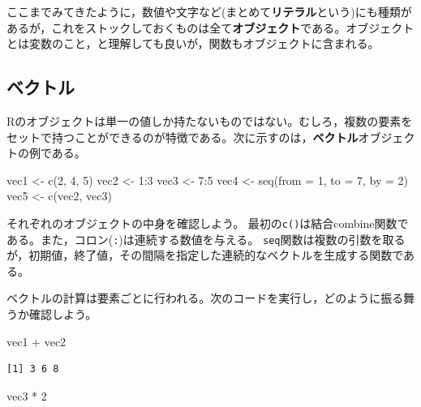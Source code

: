 \documentclass[
  a4paper,
]{ltjsbook}
\newenvironment{Shaded}{\begin{snugshade}}{\end{snugshade}}
\newcommand{\AttributeTok}[1]{\textcolor[rgb]{0.40,0.45,0.13}{#1}}
\newcommand{\DecValTok}[1]{\textcolor[rgb]{0.68,0.00,0.00}{#1}}
\newcommand{\FunctionTok}[1]{\textcolor[rgb]{0.28,0.35,0.67}{#1}}
\newcommand{\NormalTok}[1]{\textcolor[rgb]{0.00,0.23,0.31}{#1}}
\newcommand{\OtherTok}[1]{\textcolor[rgb]{0.00,0.23,0.31}{#1}}
\newcommand{\SpecialCharTok}[1]{\textcolor[rgb]{0.37,0.37,0.37}{#1}}
\begin{document}
ここまでみてきたように，数値や文字など(まとめて\textbf{リテラル}という)にも種類があるが，これをストックしておくものは全て\textbf{オブジェクト}である。オブジェクトとは変数のこと，と理解しても良いが，関数もオブジェクトに含まれる。

\subsection{ベクトル}\label{sec-vector}

Rのオブジェクトは単一の値しか持たないものではない。むしろ，複数の要素をセットで持つことができるのが特徴である。次に示すのは，\textbf{ベクトル}オブジェクトの例である。

\begin{Shaded}
\begin{Highlighting}[]
\NormalTok{vec1 }\OtherTok{\textless{}{-}} \FunctionTok{c}\NormalTok{(}\DecValTok{2}\NormalTok{, }\DecValTok{4}\NormalTok{, }\DecValTok{5}\NormalTok{)}
\NormalTok{vec2 }\OtherTok{\textless{}{-}} \DecValTok{1}\SpecialCharTok{:}\DecValTok{3}
\NormalTok{vec3 }\OtherTok{\textless{}{-}} \DecValTok{7}\SpecialCharTok{:}\DecValTok{5}
\NormalTok{vec4 }\OtherTok{\textless{}{-}} \FunctionTok{seq}\NormalTok{(}\AttributeTok{from =} \DecValTok{1}\NormalTok{, }\AttributeTok{to =} \DecValTok{7}\NormalTok{, }\AttributeTok{by =} \DecValTok{2}\NormalTok{)}
\NormalTok{vec5 }\OtherTok{\textless{}{-}} \FunctionTok{c}\NormalTok{(vec2, vec3)}
\end{Highlighting}
\end{Shaded}

それぞれのオブジェクトの中身を確認しよう。
最初の\texttt{c()}は結合combine関数である。また，コロン(\texttt{:})は連続する数値を与える。
\texttt{seq}関数は複数の引数を取るが，初期値，終了値，その間隔を指定した連続的なベクトルを生成する関数である。

ベクトルの計算は要素ごとに行われる。次のコードを実行し，どのように振る舞うか確認しよう。

\begin{Shaded}
\begin{Highlighting}[]
\NormalTok{vec1 }\SpecialCharTok{+}\NormalTok{ vec2}
\end{Highlighting}
\end{Shaded}

\begin{verbatim}
[1] 3 6 8
\end{verbatim}

\begin{Shaded}
\begin{Highlighting}[]
\NormalTok{vec3 }\SpecialCharTok{*} \DecValTok{2}
\end{Highlighting}
\end{Shaded}
\end{document}
